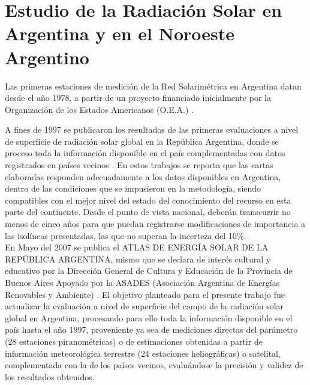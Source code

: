 \section{Estudio de la Radiación Solar en Argentina y en el Noroeste Argentino}

Las primeras estaciones de medición de la Red Solarimétrica en Argentina datan desde el año 1978, a partir de un proyecto financiado inicialmente por la Organización de los Estados Americanos (O.E.A.) \citep{GrossiGallegos1999}.

A fines de 1997 se publicaron los resultados de las primeras evaluaciones a nivel de superficie de radiación solar global en la República Argentina, donde se proceso toda la información disponible en el país complementadas con datos registrados en países vecinos \cite{GrossiGallegos1998A, GrossiGallegos1998B}. En estos trabajos se reporta que  las cartas elaboradas responden adecuadamente a los datos  disponibles en Argentina, dentro de las condiciones que se impusieron en la metodología, siendo compatibles con el mejor nivel del estado del conocimiento del recurso en esta parte del continente.
Desde el punto de vista nacional, deberán transcurrir no menos de cinco años para que puedan registrarse modificaciones de importancia a las isolíneas presentadas, las que no superan la incerteza del 10\%.\\


En Mayo del 2007 se publica el ATLAS DE ENERGÍA SOLAR DE LA REPÚBLICA ARGENTINA, mismo que se declara de interés cultural y educativo por la Dirección General
de Cultura y Educación de la Provincia de Buenos Aires Apoyado por la ASADES (Asociación Argentina de Energías Renovables y Ambiente) \citep{GrossiRighini2007}. El objetivo planteado para el presente trabajo fue actualizar la evaluación a nivel de superficie del campo de la radiación solar global en Argentina, procesando para ello toda la información disponible en el país hasta el año 1997, proveniente ya sea de mediciones directas del parámetro (28 estaciones piranométricas) o de estimaciones obtenidas a partir de información meteorológica terrestre (24 estaciones heliográficas) o satelital, complementada con la de los países vecinos, evaluándose la precisión y validez de los resultados obtenidos.\\




